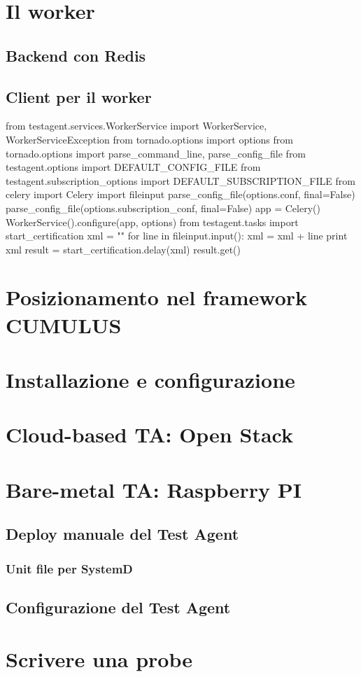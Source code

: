 \section{Il worker}
\subsection{Backend con Redis}
\subsection{Client per il worker}
\begin{python}
from testagent.services.WorkerService import WorkerService, WorkerServiceException
from tornado.options import options
from tornado.options import parse_command_line, parse_config_file
from testagent.options import DEFAULT_CONFIG_FILE
from testagent.subscription_options import DEFAULT_SUBSCRIPTION_FILE
from celery import Celery
import fileinput
parse_config_file(options.conf, final=False)
parse_config_file(options.subscription_conf, final=False)
app = Celery()
WorkerService().configure(app, options)
from testagent.tasks import start_certification
xml = ""
for line in fileinput.input():
    xml = xml + line 
print xml
result = start_certification.delay(xml)
result.get()
\end{python}

\section{Posizionamento nel framework CUMULUS}


\section{Installazione e configurazione}
\section{Cloud-based TA: Open Stack}
\section{Bare-metal TA: Raspberry PI}
\subsection{Deploy manuale del Test Agent}
\subsubsection{Unit file per SystemD}
\subsection{Configurazione del Test Agent}

\section{Scrivere una probe}